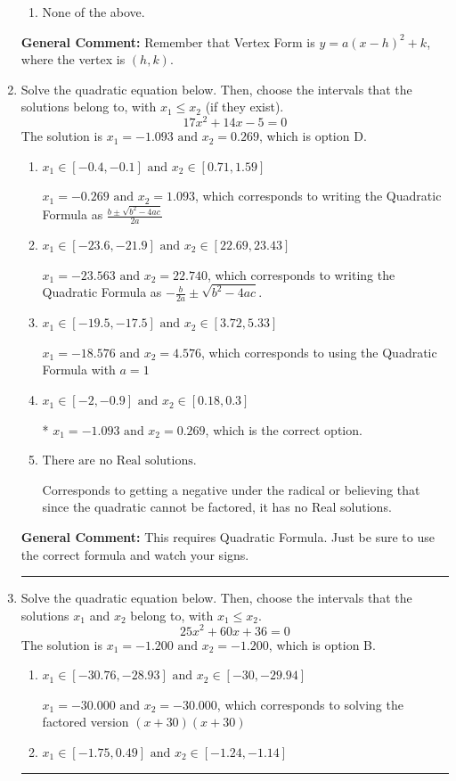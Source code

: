 \documentclass{extbook}[14pt]
\newcommand{\litem}[1]{\item #1

\rule{\textwidth}{0.4pt}}
\begin{document}
\begin{enumerate}
{\begin{enumerate}[label=\Alph*.]
\begin{multicols}{2}
\end{multicols}\item None of the above.\end{enumerate}
\textbf{General Comment:} Remember that Vertex Form is $y = a(x-h)^2+k$, where the vertex is $(h, k)$.
}
\litem{
Solve the quadratic equation below. Then, choose the intervals that the solutions belong to, with $x_1 \leq x_2$ (if they exist).
\[ 17x^{2} +14 x -5 = 0 \]The solution is \( x_1 = -1.093 \text{ and } x_2 = 0.269 \), which is option D.\begin{enumerate}[label=\Alph*.]
\item \( x_1 \in [-0.4, -0.1] \text{ and } x_2 \in [0.71, 1.59] \)

 $x_1 = -0.269 \text{ and } x_2 = 1.093$, which corresponds to writing the Quadratic Formula as $\frac{b \pm \sqrt{b^2 - 4ac}}{2a}$
\item \( x_1 \in [-23.6, -21.9] \text{ and } x_2 \in [22.69, 23.43] \)

 $x_1 = -23.563 \text{ and } x_2 = 22.740$, which corresponds to writing the Quadratic Formula as $-\frac{b}{2a} \pm \sqrt{b^2 - 4ac}$.
\item \( x_1 \in [-19.5, -17.5] \text{ and } x_2 \in [3.72, 5.33] \)

 $x_1 = -18.576 \text{ and } x_2 = 4.576$, which corresponds to using the Quadratic Formula with $a=1$
\item \( x_1 \in [-2, -0.9] \text{ and } x_2 \in [0.18, 0.3] \)

* $x_1 = -1.093 \text{ and } x_2 = 0.269$, which is the correct option.
\item \( \text{There are no Real solutions.} \)

Corresponds to getting a negative under the radical or believing that since the quadratic cannot be factored, it has no Real solutions.
\end{enumerate}

\textbf{General Comment:} This requires Quadratic Formula. Just be sure to use the correct formula and watch your signs.
}
\litem{
Solve the quadratic equation below. Then, choose the intervals that the solutions $x_1$ and $x_2$ belong to, with $x_1 \leq x_2$.
\[ 25x^{2} +60 x + 36 = 0 \]The solution is \( x_1 = -1.200 \text{ and } x_2 = -1.200 \), which is option B.\begin{enumerate}[label=\Alph*.]
\item \( x_1 \in [-30.76, -28.93] \text{ and } x_2 \in [-30, -29.94] \)

$x_1 = -30.000 \text{ and } x_2 = -30.000$, which corresponds to solving the factored version $(x + 30)(x + 30)$
\item \( x_1 \in [-1.75, 0.49] \text{ and } x_2 \in [-1.24, -1.14] \)


\end{enumerate}}
\end{enumerate}
\end{document}
